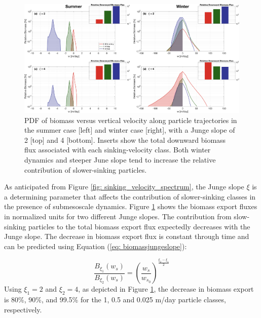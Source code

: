 \documentclass[draft,linenumbers]{agujournal2018}
\newcommand{\fixme}[1]{\color{red}$<$\textbf{FIX ME: #1}$>$\color{black}}
\begin{document}
\begin{figure}[t]
	\centering
	\includegraphics[width = 1\linewidth]{figures/Fig7.png}
	\caption{PDF of biomass versus vertical velocity along particle trajectories in the summer case [left] and winter case [right], with a Junge slope of 2 [top] and 4 [bottom]. Inserts show the total downward biomass flux associated with each sinking-velocity class. Both winter dynamics and steeper June slope tend to increase the relative contribution of slower-sinking particles.}	
	\label{fig: biomass_export}
\end{figure}

As anticipated from Figure \ref{fig: sinking_velocity_spectrum}, the Junge slope $\xi$ is a determining parameter that affects the contribution of slower-sinking classes in the presence of submesoscale dynamics. Figure \ref{fig: biomass_export} shows the biomass export fluxes in normalized units for two different Junge slopes. The contribution from slow-sinking particles to the total biomass export flux expectedly decreases with the Junge slope. The decrease in biomass export flux is constant through time and can be predicted using Equation (\ref{eq: biomassjungeslope}):

\begin{equation}
    \frac{B_{\xi_1}(w_s)}{B_{\xi_2}(w_s)} = \left(\frac{w_s}{w_{s_0}}\right)^{\frac{\xi_2-\xi_1}{2}}
\end{equation}
Using $\xi_1 = 2$ and $\xi_2 = 4$, as depicted in Figure \ref{fig: biomass_export}, the decrease in biomass export is 80\%, 90\%, and 99.5\% for the 1, 0.5 and 0.025 m/day particle classes, respectively. %
\end{document}
